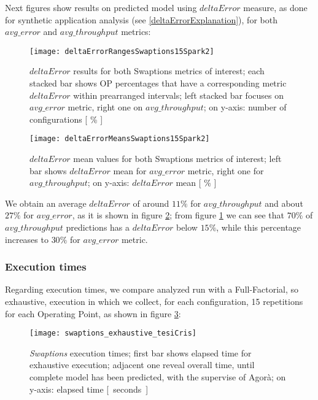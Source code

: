 Next figures show results on predicted model using $deltaError$ measure, as done for synthetic application analysis (see \ref{deltaErrorExplanation}), for both $avg\_error$ and $avg\_throughput$ metrics:





\begin{figure}[H]

    \centering
    \texttt{[image: deltaErrorRangesSwaptions15Spark2]}
    \caption{$deltaError$ results for both Swaptions metrics of interest; each stacked bar shows OP percentages that have a corresponding metric $deltaError$ within prearranged intervals; left stacked bar focuses on $avg\_error$ metric, right one on $avg\_throughput$; on y-axis: number of configurations [ \% ]}
    \label{fig::swaptions15spark2::intervals}
    
\end{figure}

\begin{figure}[H]

    \centering
    \texttt{[image: deltaErrorMeansSwaptions15Spark2]}
    \caption{$deltaError$ mean values for both Swaptions metrics of interest; left bar shows $deltaError$ mean for $avg\_error$ metric, right one for $avg\_throughput$; on y-axis: $deltaError$ mean [ \% ]}
    \label{fig::swaptions15spark2::means}
    
\end{figure}





We obtain an average $deltaError$ of around $11\%$ for $avg\_throughput$ and about $27\%$ for $avg\_error$, as it is shown in figure \ref{fig::swaptions15spark2::means}; from figure \ref{fig::swaptions15spark2::intervals} we can see that $70\%$ of $avg\_throughput$ predictions has a $deltaError$ below $15\%$, while this percentage increases to $30\%$ for $avg\_error$ metric.


\subsubsection{Execution times}

Regarding execution times, we compare analyzed run with a Full-Factorial, so exhaustive, execution in which we collect, for each configuration, 15 repetitions for each Operating Point, as shown in figure \ref{fig::sw::execT}:

\begin{figure}[H]

    \centering
    
    \texttt{[image: swaptions\_exhaustive\_tesiCris]}
    
    \caption{\textit{Swaptions} execution times; first bar shows elapsed time for exhaustive execution; adjacent one reveal overall time, until complete model has been predicted, with the supervise of Agorà; on y-axis: elapsed time \hbox{[ seconds ]}}
    
    \label{fig::sw::execT}
    
\end{figure}


